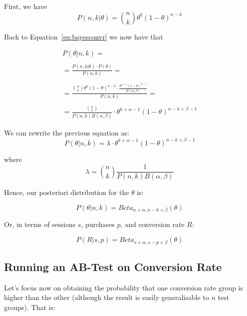 \documentclass[11pt, a4wide]{article}   	%
\newcommand{\sessions}{s}
\newcommand{\purchases}{p}
\newcommand{\sepu}{\sessions, \purchases}
\newcommand{\convr}{R}
\begin{document}
First, we have
\begin{equation}
P(n,k|\theta) = \binom{n}{k}\theta^k(1-\theta)^{n-k} 
\end{equation}



Back to Equation~\ref{eq:bayesconvr} we now have that

\begin{equation}
\begin{array}{c}
P(\theta|n,k) = \\
\\
=  \frac{P(n,k|\theta)\cdot P(\theta)}{P(n,k)}  = \\
\\
=  \frac{\binom{n}{k}\theta^k(1-\theta)^{n-k} \cdot \frac{\theta^{\alpha-1}(1-\theta)^{\beta-1}}{B(\alpha,\beta)}}{P(n,k)} = \\
\\
=  \frac{\binom{n}{k}}{P(n,k)B(\alpha,\beta)} \cdot \theta^{k + \alpha-1}(1-\theta)^{n-k+\beta-1}
\end{array}
\end{equation}

We can rewrite the previous equation as:
\begin{equation}
P(\theta|n,k) = \lambda \cdot \theta^{k + \alpha-1}(1-\theta)^{n-k+\beta-1}
\end{equation}


where
\begin{equation}
\lambda = \binom{n}{k}\frac{1}{P(n,k)B(\alpha,\beta)} 
\end{equation}

Hence, our posteriori distribution for the $\theta$ is:

\begin{equation}
P(\theta|n,k) = Beta_{n+\alpha,n-k+\beta}(\theta)
\end{equation}

Or, in terms of sessions $\sessions$, purchases $\purchases$, and conversion rate $\convr$:

\begin{equation}
P(\convr|\sepu) = Beta_{\sessions+\alpha,\sessions-\purchases+\beta}(\theta)
\end{equation}

\subsection{Running an AB-Test on Conversion Rate}

Let's focus now on obtaining the probability that one conversion rate group is higher than the other (although the result is easily generalisable to $n$ test groups). That is:
\end{document}
